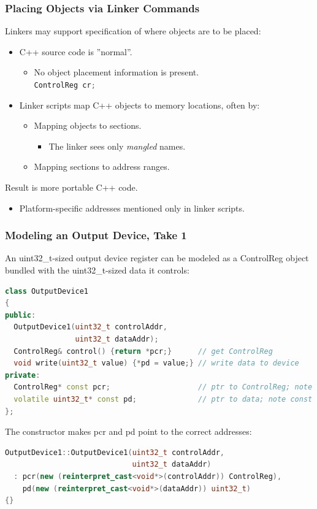 \subsubsection{Placing Objects via Linker Commands}
Linkers may support specification of where objects are to be placed:
\begin{itemize}
  \item C++ source code is ''normal''.
  \begin{itemize}
    \item No object placement information is present.\\
    \lstinline[language=C++]{ControlReg cr;}
  \end{itemize}
  \item Linker scripts map C++ objects to memory locations, often by:
  \begin{itemize}
    \item Mapping objects to sections.
    \begin{itemize}
      \item The linker sees only \textit{mangled} names.
    \end{itemize}
    \item Mapping sections to address ranges.
  \end{itemize}
\end{itemize}
Result is more portable C++ code.
\begin{itemize}
  \item Platform-specific addresses mentioned only in linker scripts.
\end{itemize}

\subsubsection{Modeling an Output Device, Take 1}
An uint32\_t-sized output device register can be modeled as a ControlReg object bundled with the uint32\_t-sized data it controls:
\begin{lstlisting}[language=C++]
class OutputDevice1
{
public:
  OutputDevice1(uint32_t controlAddr,
                uint32_t dataAddr);
  ControlReg& control() {return *pcr;}      // get ControlReg
  void write(uint32_t value) {*pd = value;} // write data to device
private:
  ControlReg* const pcr;                    // ptr to ControlReg; note const
  volatile uint32_t* const pd;              // ptr to data; note const and volatile
};
\end{lstlisting}

The constructor makes pcr and pd point to the correct addresses:
\begin{lstlisting}[language=C++]
OutputDevice1::OutputDevice1(uint32_t controlAddr,
                             uint32_t dataAddr)
  : pcr(new (reinterpret_cast<void*>(controlAddr)) ControlReg),
    pd(new (reinterpret_cast<void*>(dataAddr)) uint32_t)
{}
\end{lstlisting}


